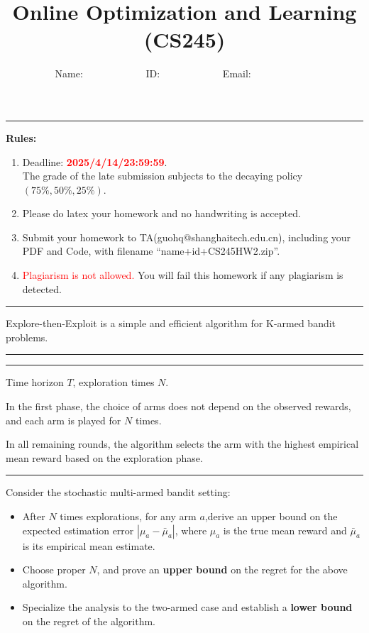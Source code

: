 \documentclass[11pt,oneside,a4paper]{article}
\title{Online Optimization and Learning (CS245)}
\author{Name: ~~~~~~~~~~~~ID: ~~~~~~~~~~~~Email: ~~~~~~~~~~~~}
\date{}
\begin{document}
\maketitle
\noindent
\rule{\linewidth}{0.4pt}
{\bf {\large Rules:}}
\begin{enumerate} 
    \item Deadline: \textcolor{red}{\textbf{2025/4/14/23:59:59}}.\\ The grade of the late submission subjects to the decaying policy $(75\%, 50\%, 25\%)$.
    \item Please do latex your homework and no handwriting is accepted.
    \item Submit your homework to TA(guohq@shanghaitech.edu.cn), including your PDF and Code, with filename ``{\sf name+id+CS245HW2.zip}''.
    \item \textcolor{red}{Plagiarism is not allowed.} You will fail this homework if any plagiarism is detected.
    \end{enumerate}
    \vspace{-0.3cm}
\rule{\linewidth}{0.4pt}

\newpage
{}

\vspace{0.5cm}
\noindent 
Explore-then-Exploit is a simple and efficient algorithm for K-armed bandit problems.
\vspace{0.1in}
\hrule
\vspace{0.05in}
\vspace{0.05in}
\hrule
\vspace{0.05in}

 Time horizon $T$, exploration times $N$.

 \noindent In the first phase, the choice of arms does not depend on the observed rewards, and each arm is played for $N$ times.

 In all remaining rounds, the algorithm selects the arm with the highest empirical mean reward based on the exploration phase.

\vspace{0.02in}
\hrule
\vspace{0.5cm}
\noindent Consider the stochastic multi-armed bandit setting:
\begin{itemize}
    \item After $N$ times explorations, for any arm $a$,derive an upper bound on the expected estimation error $|\mu_a - \bar \mu_a|$, where $\mu_a$ is the true mean reward and $\bar \mu_a$ is its empirical mean estimate.
    \item Choose proper $N$, and prove an \textbf{upper bound} on the regret for the above algorithm.
    \item Specialize the analysis to the two-armed case and establish a \textbf{lower bound} on the regret of the algorithm.
\end{itemize}
\end{document}
